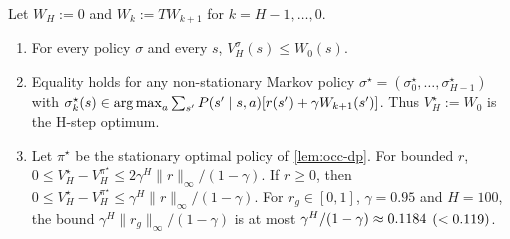 \begin{proposition}\label{prop:occ-hstep}
Let $W_H:=0$ and $W_k:=TW_{k+1}$ for $k=H-1,\dots,0$.
\begin{enumerate}[nosep,label=(\alph*)]
\item For every policy $\sigma$ and every $s$, $V^\sigma_H(s)\le W_0(s)$.
\item Equality holds for any non-stationary Markov policy $\sigma^\star=(\sigma^\star_0,\dots,\sigma^\star_{H-1})$ with $\sigma^\star_k(s)\in\argmax_a\sum_{s'}P(s'\mid s,a)[r(s')+\gamma W_{k+1}(s')]$. Thus $V^\star_H:=W_0$ is the H-step optimum.
\item Let $\pi^\star$ be the stationary optimal policy of \cref{lem:occ-dp}. For bounded $r$, $0\le V^\star_H-V^{\pi^\star}_H\le2\gamma^H\|r\|_\infty/(1-\gamma)$. If $r\ge0$, then $0\le V^\star_H-V^{\pi^\star}_H\le\gamma^H\|r\|_\infty/(1-\gamma)$. For $r_g\in[0,1]$, $\gamma=0.95$ and $H=100$, the bound $\gamma^H\|r_g\|_\infty/(1-\gamma)$ is at most $\gamma^H/(1-\gamma)\approx\vn{const.gH_over4}{0.1184}$ $(<\vn{const.gH_over_lt}{0.119})$.
\end{enumerate}
\end{proposition}
